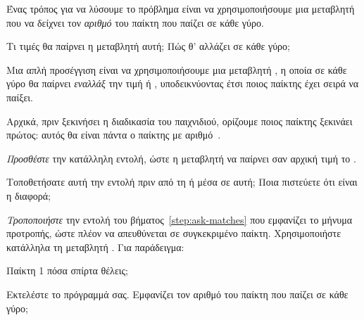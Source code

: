 \documentclass[a4paper,11pt,oneside]{book}
\begin{document}
\begin{step}
Ένας τρόπος για να λύσουμε το πρόβλημα είναι να χρησιμοποιήσουμε μια μεταβλητή  που να δείχνει τον \emph{αριθμό} του παίκτη που παίζει σε κάθε γύρο. 

Τι τιμές θα παίρνει η μεταβλητή αυτή; Πώς θ' αλλάζει σε κάθε γύρο;


\marginnote[14pt]{\icondiscuss}
\dottedline

\dottedline

Μια απλή προσέγγιση είναι να χρησιμοποιήσουμε μια μεταβλητή , η οποία σε κάθε γύρο θα παίρνει \emph{εναλλάξ} την τιμή  ή , υποδεικνύοντας έτσι ποιος παίκτης έχει σειρά να παίξει.

Αρχικά, πριν ξεκινήσει η διαδικασία του παιχνιδιού, ορίζουμε ποιος
παίκτης ξεκινάει πρώτος: αυτός θα είναι πάντα ο παίκτης με αριθμό~.

\emph{Προσθέστε} την κατάλληλη εντολή, ώστε η μεταβλητή  να παίρνει σαν αρχική τιμή το .

Τοποθετήσατε αυτή την εντολή πριν από τη  ή μέσα σε αυτή; Ποια πιστεύετε ότι είναι η διαφορά;

\marginnote[14pt]{\icondiscuss}
\dottedline

\dottedline
\end{step}

\begin{step}
\label{step:ask-matches-player}
\emph{Τροποποιήστε} την εντολή του βήματος~\ref{step:ask-matches} που εμφανίζει το μήνυμα προτροπής, ώστε πλέον να απευθύνεται σε συγκεκριμένο παίκτη. Χρησιμοποιήστε κατάλληλα τη μεταβλητή . Για παράδειγμα:

\marginnote[14pt]{\iconcomputer}
\begin{pyterm}
Παίκτη 1 πόσα σπίρτα θέλεις;
\end{pyterm}

Εκτελέστε το πρόγραμμά σας. Εμφανίζει τον αριθμό του παίκτη που παίζει σε κάθε γύρο; 

\marginnote[14pt]{\icondiscuss}
\dottedline
\end{step}
\end{document}
